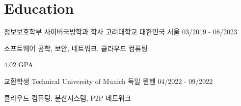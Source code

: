 \vspace{-\acvSectionTopSkip}
\section{Education}
\cventry
{정보보호학부 사이버국방학과 학사} %
{고려대학교} %
{대한민국 서울} %
{03/2019 - 08/2023} %
\begin{cvitems}
\item {소프트웨어 공학, 보안, 네트워크, 클라우드 컴퓨팅}
\item {4.02 GPA}
\end{cvitems}

\cventry
{교환학생} %
{Technical University of Munich} %
{독일 뮌헨} %
{04/2022 - 09/2022} %
\begin{cvitems}
\item {클라우드 컴퓨팅, 분산시스템, P2P 네트워크}
\end{cvitems}
